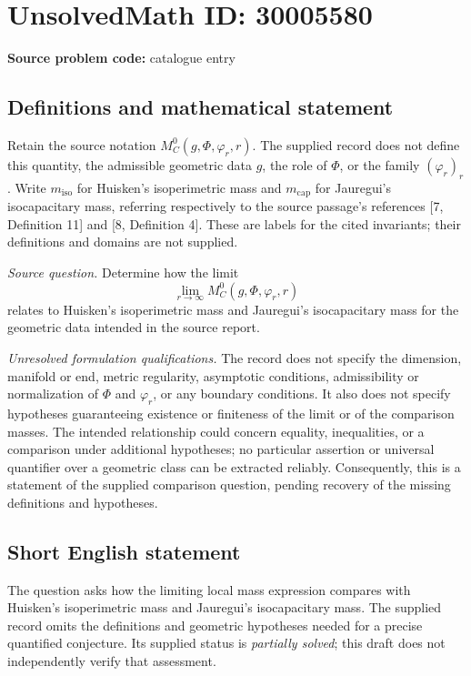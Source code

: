 \documentclass[11pt]{article}
\begin{document}
\section*{UnsolvedMath ID: 30005580}
\textbf{Source problem code:} catalogue entry
\subsection{Definitions and mathematical statement}
Retain the source notation \(M_C^0(g,\Phi,\varphi_r,r)\). The supplied record does not define this quantity, the admissible geometric data \(g\), the role of \(\Phi\), or the family \((\varphi_r)_r\). Write \(m_{\mathrm{iso}}\) for Huisken's isoperimetric mass and \(m_{\mathrm{cap}}\) for Jauregui's isocapacitary mass, referring respectively to the source passage's references [7, Definition 11] and [8, Definition 4]. These are labels for the cited invariants; their definitions and domains are not supplied.

\emph{Source question.} Determine how the limit
\[
\lim_{r\to\infty}M_C^0(g,\Phi,\varphi_r,r)
\]
relates to Huisken's isoperimetric mass and Jauregui's isocapacitary mass for the geometric data intended in the source report.

\emph{Unresolved formulation qualifications.} The record does not specify the dimension, manifold or end, metric regularity, asymptotic conditions, admissibility or normalization of \(\Phi\) and \(\varphi_r\), or any boundary conditions. It also does not specify hypotheses guaranteeing existence or finiteness of the limit or of the comparison masses. The intended relationship could concern equality, inequalities, or a comparison under additional hypotheses; no particular assertion or universal quantifier over a geometric class can be extracted reliably. Consequently, this is a statement of the supplied comparison question, pending recovery of the missing definitions and hypotheses.
\subsection{Short English statement}
The question asks how the limiting local mass expression compares with Huisken's isoperimetric mass and Jauregui's isocapacitary mass. The supplied record omits the definitions and geometric hypotheses needed for a precise quantified conjecture. Its supplied status is \emph{partially solved}; this draft does not independently verify that assessment.
\end{document}
